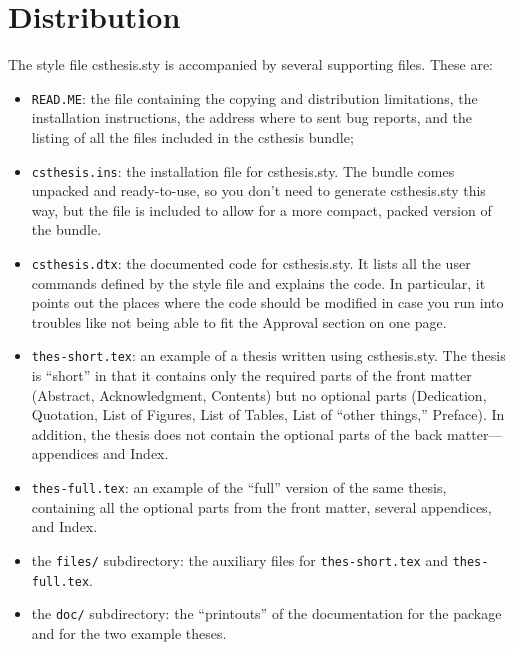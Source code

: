 \section{Distribution}

The style file
\textsf{csthesis.sty} is
accompanied by several supporting files. These
are:

\begin{itemize}
\item \texttt{READ.ME}: the file containing the copying and
  distribution limitations, the installation instructions, the address
  where to sent bug reports, and the listing of all the files included
  in the \textsf{csthesis}%
   bundle;
\item \texttt{csthesis.ins}:
  the installation file for
  \textsf{csthesis.sty}. The
  bundle comes unpacked and ready-to-use, so you don't need to
  generate \textsf{csthesis.sty} this way, but the file is included to
  allow for a more compact, packed version of the bundle.
\item \texttt{csthesis.dtx}:
  the documented code for \textsf{csthesis.sty}. It lists all the user
  commands defined by the style file and explains the code. In
  particular, it points out the places where the code should be
  modified in case you run into troubles like not being able to fit
  the Approval section on one page.
\item
  \texttt{thes-short.tex}:
  an example of a thesis written using \textsf{csthesis.sty}. The
  thesis is ``short'' in that it contains only the required parts of
  the front matter (Abstract, Acknowledgment, Contents) but no
  optional parts (Dedication, Quotation, List
  of Figures, List of Tables, List of ``other things,'' Preface). In
  addition, the thesis does not contain the optional parts of the back
  matter---appendices and Index.
\item
  \texttt{thes-full.tex}:
  an example of the ``full'' version of the same thesis, containing
  all the optional parts from the front
  matter, several appendices, and Index.
\item the \texttt{files/} subdirectory:
  the auxiliary files for \texttt{thes-short.tex} and
  \texttt{thes-full.tex}.
\item the \texttt{doc/} subdirectory: the
  ``printouts'' of the documentation for the
  package and for the two example theses.
\end{itemize}
 
